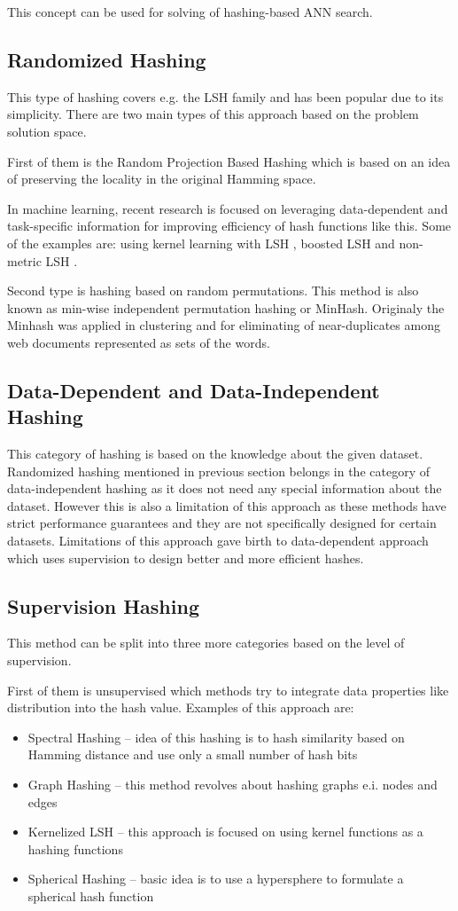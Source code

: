 This concept can be used for solving of hashing-based ANN search.

\subsection{Randomized Hashing}
This type of hashing covers e.g. the LSH family and has been popular due to its simplicity. There are two main types of this approach based on the problem solution space. 

First of them is the Random Projection Based Hashing which is based on an idea of preserving the locality in the original Hamming space.

In machine learning, recent research is focused on leveraging data-dependent and task-specific information for improving efficiency of hash functions like this. Some of the examples are: using kernel learning with LSH \cite{kernelLSH}, boosted LSH \cite{boostLSH} and non-metric LSH \cite{nonMLSH}.

Second type is hashing based on random permutations. This method is also known as min-wise independent permutation hashing or MinHash. Originaly the Minhash was applied in clustering and for eliminating of near-duplicates among web documents represented as sets of the words. \cite{minhashuse}

\subsection{Data-Dependent and Data-Independent Hashing}
This category of hashing is based on the knowledge about the given dataset. Randomized hashing mentioned in previous section belongs in the category of data-independent hashing as it does not need any special information about the dataset. However this is also a limitation of this approach as these methods have strict performance guarantees and they are not specifically designed for certain datasets. Limitations of this approach gave birth to data-dependent approach which uses supervision to design better and more efficient hashes. \cite{learnHash} 

\subsection{Supervision Hashing}
This method can be split into three more categories based on the level of supervision.

First of them is unsupervised which methods try to integrate data properties like distribution into the hash value. Examples of this approach are: 
\begin{itemize}
\item Spectral Hashing -- idea of this hashing is to hash similarity based on Hamming distance and use only a small number of hash bits
\item Graph Hashing -- this method revolves about hashing graphs e.i. nodes and edges
\item Kernelized LSH -- this approach is focused on using kernel functions as a hashing functions
\item Spherical Hashing -- basic idea is to use a hypersphere to formulate a spherical hash function
\end{itemize}

